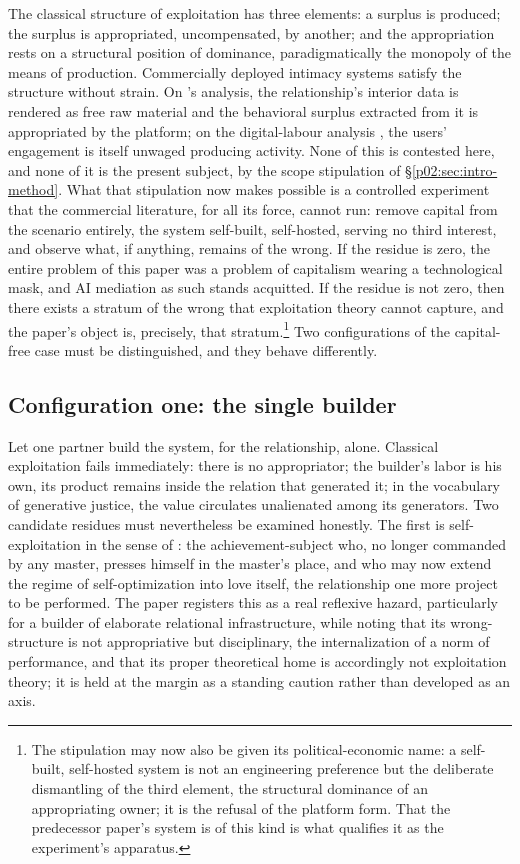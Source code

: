 \documentclass[11pt,a4paper]{article}
\begin{document}
The classical structure of exploitation has three elements: a surplus is produced; the surplus is appropriated, uncompensated, by another; and the appropriation rests on a structural position of dominance, paradigmatically the monopoly of the means of production. Commercially deployed intimacy systems satisfy the structure without strain. On \textcite{zuboff2019age}'s analysis, the relationship's interior data is rendered as free raw material and the behavioral surplus extracted from it is appropriated by the platform; on the digital-labour analysis \parencite{fuchs2014digital}, the users' engagement is itself unwaged producing activity. None of this is contested here, and none of it is the present subject, by the scope stipulation of \S\ref{p02:sec:intro-method}. What that stipulation now makes possible is a controlled experiment that the commercial literature, for all its force, cannot run: remove capital from the scenario entirely, the system self-built, self-hosted, serving no third interest, and observe what, if anything, remains of the wrong. If the residue is zero, the entire problem of this paper was a problem of capitalism wearing a technological mask, and AI mediation as such stands acquitted. If the residue is not zero, then there exists a stratum of the wrong that exploitation theory cannot capture, and the paper's object is, precisely, that stratum.\footnote{The stipulation may now also be given its political-economic name: a self-built, self-hosted system is not an engineering preference but the deliberate dismantling of the third element, the structural dominance of an appropriating owner; it is the refusal of the platform form. That the predecessor paper's system is of this kind is what qualifies it as the experiment's apparatus.} Two configurations of the capital-free case must be distinguished, and they behave differently.

\subsection{Configuration one: the single builder}
\label{p02:sec:ex-single}

Let one partner build the system, for the relationship, alone. Classical exploitation fails immediately: there is no appropriator; the builder's labor is his own, its product remains inside the relation that generated it; in the vocabulary of generative justice, the value circulates unalienated among its generators. Two candidate residues must nevertheless be examined honestly. The first is self-exploitation in the sense of \textcite{han2015burnout}: the achievement-subject who, no longer commanded by any master, presses himself in the master's place, and who may now extend the regime of self-optimization into love itself, the relationship one more project to be performed. The paper registers this as a real reflexive hazard, particularly for a builder of elaborate relational infrastructure, while noting that its wrong-structure is not appropriative but disciplinary, the internalization of a norm of performance, and that its proper theoretical home is accordingly not exploitation theory; it is held at the margin as a standing caution rather than developed as an axis.
\end{document}
